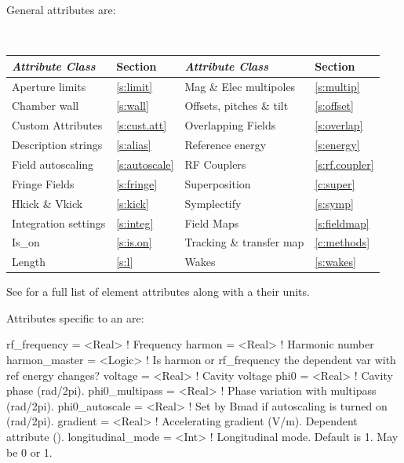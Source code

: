 {General  attributes are:
\begin{center}
\tt
\begin{tabular}{llll} \toprule
  {\sl Attribute Class}      & Section            & {\sl Attribute Class}      & Section            \\ \midrule
  Aperture limits            & \ref{s:limit}      & Mag \& Elec multipoles     & \ref{s:multip}     \\
  Chamber wall               & \ref{s:wall}       & Offsets, pitches \& tilt   & \ref{s:offset}     \\
  Custom Attributes          & \ref{s:cust.att}   & Overlapping Fields         & \ref{s:overlap}    \\ 
  Description strings        & \ref{s:alias}      & Reference energy           & \ref{s:energy}     \\
  Field autoscaling          & \ref{s:autoscale}  & RF Couplers                & \ref{s:rf.coupler} \\
  Fringe Fields              & \ref{s:fringe}     & Superposition              & \ref{c:super}      \\
  Hkick \& Vkick             & \ref{s:kick}       & Symplectify                & \ref{s:symp}       \\
  Integration settings       & \ref{s:integ}      & Field Maps                 & \ref{s:fieldmap}   \\
  Is_on                      & \ref{s:is.on}      & Tracking \& transfer map   & \ref{c:methods}    \\
  Length                     & \ref{s:l}          & Wakes                      & \ref{s:wakes}      \\
  \bottomrule
\end{tabular}
\end{center}
\toffset
See  for a full list of element attributes along with a their units.

Attributes specific to an  are:
\begin{example}
  rf_frequency    = <Real>    ! Frequency
  harmon          = <Real>    ! Harmonic number
  harmon_master   = <Logic>   ! Is harmon or rf_frequency the dependent var with ref energy changes?
  voltage         = <Real>    ! Cavity voltage
  phi0            = <Real>    ! Cavity phase (rad/2pi).
  phi0_multipass  = <Real>    ! Phase variation with multipass (rad/2pi).
  phi0_autoscale  = <Real>    ! Set by Bmad if autoscaling is turned on (rad/2pi).
  gradient        = <Real>    ! Accelerating gradient (V/m). Dependent attribute ().
  longitudinal_mode = <Int>   ! Longitudinal mode. Default is 1. May be 0 or 1.
\end{example}

}
